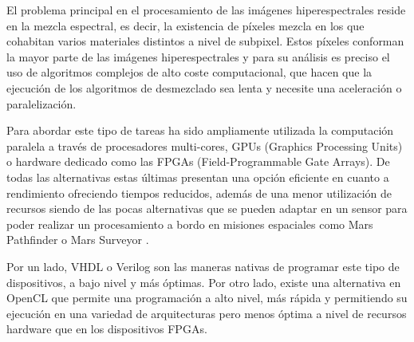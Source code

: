 El problema principal en el procesamiento de las imágenes hiperespectrales reside en la mezcla espectral, es decir, la existencia de píxeles mezcla en los que cohabitan varios materiales distintos a nivel de subpixel. Estos píxeles conforman la mayor parte de las imágenes hiperespectrales y para su análisis es preciso el uso de algoritmos complejos de alto coste computacional, que hacen que la ejecución de los algoritmos de desmezclado sea lenta y necesite una aceleración o paralelización.

Para abordar este tipo de tareas ha sido ampliamente utilizada la computación paralela a través de procesadores multi-cores, GPUs (Graphics Processing Units) o hardware dedicado como las FPGAs (Field-Programmable Gate Arrays). De todas las alternativas estas últimas presentan una opción eficiente en cuanto a rendimiento ofreciendo tiempos reducidos, además de una menor utilización de recursos siendo de las pocas alternativas que se pueden adaptar en un sensor para poder realizar un procesamiento a bordo en misiones espaciales como Mars Pathfinder o Mars Surveyor \cite{biblio:TFG_Esquembri}.

Por un lado, VHDL o Verilog son las maneras nativas de programar este tipo de dispositivos, a bajo nivel y más óptimas. Por otro lado, existe una alternativa en OpenCL que permite una programación a alto nivel, más rápida y permitiendo su ejecución en una variedad de arquitecturas pero menos óptima a nivel de recursos hardware que en los dispositivos FPGAs.

    
